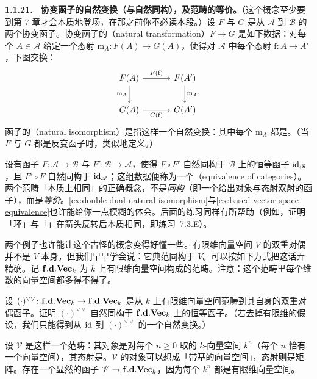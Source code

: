 \textbf{1.1.21. \hard\ 协变函子的自然变换（与自然同构），及范畴的等价。}\quad （这个概念至少要到第 7 章才会本质地登场，在那之前你不必读本段。）设 $F$ 与 $G$ 是从 $\mathscr{A}$ 到 $\mathscr{B}$ 的两个协变函子。协变函子的\textbf{\trNaturalTransformation}（natural transformation）$F\to G$ 是如下数据：对每个 $A\in\mathscr{A}$ 给定一个态射 $\mathrm{m}_A\colon F(A)\to G(A)$，使得对 $\mathscr{A}$ 中每个态射 $\mathrm{f}\colon A\to A'$，下图交换：
\[
\begin{tikzcd}[row sep=2em, column sep=3.2em]
F(A) \ar[r,"F(\mathrm{f})"] \ar[d,"\mathrm{m}_A"'] & F(A') \ar[d,"\mathrm{m}_{A'}"] \\
G(A) \ar[r,"G(\mathrm{f})"'] & G(A')
\end{tikzcd}
\]
函子的\textbf{\trNaturalIsomorphism}（natural isomorphism）是指这样一个自然变换：其中每个 $\mathrm{m}_A$ 都是\trIsomorphism。（当 $F$ 与 $G$ 都是反变函子时，类似地定义。）

设有函子 $F\colon\mathscr{A}\to\mathscr{B}$ 与 $F'\colon\mathscr{B}\to\mathscr{A}$，使得 $F\circ F'$ 自然同构于 $\mathscr{B}$ 上的恒等函子 $\mathrm{id}_{\mathscr{B}}$，且 $F'\circ F$ 自然同构于 $\mathrm{id}_{\mathscr{A}}$；这组数据便称为一个\textbf{\trEquivalenceOfCategories}（equivalence of categories）。两个范畴「本质上相同」的正确概念，不是\emph{同构}（即一个给出对象与态射双射的函子），而是\emph{等价}。\cref{ex:double-dual-natural-isomorphism}与\cref{ex:based-vector-space-equivalence}也许能给你一点模糊的体会。后面的练习同样有所帮助（例如，证明「环」与「\trAffineScheme」在箭头反转后本质相同，即练习~7.3.E）。

两个例子也许能让这个古怪的概念变得好懂一些。有限维向量空间 $V$ 的双重对偶并不是 $V$ 本身，但我们早早学会说：它典范同构于 $V$。可以按如下方式把这话弄精确。记 $\mathbf{f.d.Vec}_{k}$ 为 $k$ 上有限维向量空间构成的范畴。注意：这个范畴里每个维数的向量空间都多得不得了。

\begin{exercise}\label{ex:double-dual-natural-isomorphism}
设 $(\cdot)^{\vee\vee}\colon\mathbf{f.d.Vec}_{k}\to\mathbf{f.d.Vec}_{k}$ 是从 $k$ 上有限维向量空间范畴到其自身的双重对偶函子。证明 $(\cdot)^{\vee\vee}$ 自然同构于 $\mathbf{f.d.Vec}_{k}$ 上的恒等函子。（若去掉有限维的假设，我们只能得到从 $\mathrm{id}$ 到 $(\cdot)^{\vee\vee}$ 的一个自然变换。）

设 $\mathscr{V}$ 是这样一个范畴：其对象是对每个 $n\ge 0$ 取的 $k$-向量空间 $k^n$（每个 $n$ 恰有一个向量空间），其态射是\trLinearTransformation。$\mathscr{V}$ 的对象可以想成「带基的向量空间」，态射则是矩阵。存在一个显然的函子 $\mathscr{V}\to\mathbf{f.d.Vec}_{k}$，因为每个 $k^n$ 都是有限维向量空间。
\end{exercise}

